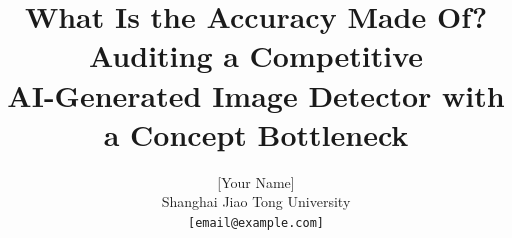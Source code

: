 \documentclass{article}
\title{What Is the Accuracy Made Of? Auditing a Competitive\\ AI-Generated Image Detector with a Concept Bottleneck}
\author{%
  [Your Name] \\
  Shanghai Jiao Tong University \\
  \texttt{[email@example.com]}
}
\begin{document}
\maketitle

\begin{abstract}

\end{abstract}



\medskip





\end{document}
